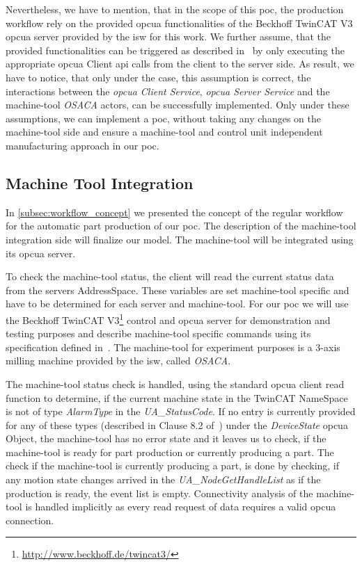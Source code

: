 \documentclass[
a4paper,
twoside,
headsepline,
cleardoublepage=empty,
parskip=half,
draft=false
]{scrbook}
\begin{document}
				Nevertheless, we have to mention, that in the scope of this \gls{poc}, the production workflow rely on the provided \gls{opcua} functionalities of the Beckhoff TwinCAT V3 \gls{opcua} server provided by the \gls{isw} for this work. We further assume, that the provided functionalities can be triggered as described in~\cite{twincat2018} by only executing the appropriate \gls{opcua} Client \gls{api} calls from the client to the server side. As result, we have to notice, that only under the case, this assumption is correct, the interactions between the \textit{\gls{opcua} Client Service}, \textit{\gls{opcua} Server Service} and the machine-tool \textit{OSACA} actors, can be successfully implemented. Only under these assumptions, we can implement a \gls{poc}, without taking any changes on the machine-tool side and ensure a machine-tool and control unit independent manufacturing approach in our \gls{poc}.

			\subsection{Machine Tool Integration} \label{subsec:machine_tool_intergation}

				In \cref{subsec:workflow_concept} we presented the concept of the regular workflow for the automatic part production of our \gls{poc}. The description of the machine-tool integration side will finalize our model. The machine-tool will be integrated using its \gls{opcua} server.

				To check the machine-tool status, the client will read the current status data from the servers AddressSpace. These variables are set machine-tool specific and have to be determined for each server and machine-tool. For our \gls{poc} we will use the Beckhoff TwinCAT V3\footnote{\url{http://www.beckhoff.de/twincat3/}} control and \gls{opcua} server for demonstration and testing purposes and describe machine-tool specific commands using its specification defined in~\cite{twincat2018}. The machine-tool for experiment purposes is a 3-axis milling machine provided by the \gls{isw}, called \textit{OSACA}.

				The machine-tool status check is handled, using the standard \gls{opcua} client read function to determine, if the current machine state in the TwinCAT NameSpace is not of type \textit{AlarmType} in the \textit{UA\_StatusCode}. If no entry is currently provided for any of these types (described in Clause 8.2 of~\cite{twincat2018}) under the \textit{DeviceState} \gls{opcua} Object, the machine-tool has no error state and it leaves us to check, if the machine-tool is ready for part production or currently producing a part. The check if the machine-tool is currently producing a part, is done by checking, if any motion state changes arrived in the \textit{UA\_NodeGetHandleList} as if the production is ready, the event list is empty. Connectivity analysis of the machine-tool is handled implicitly as every read request of data requires a valid \gls{opcua} connection.
\end{document}
